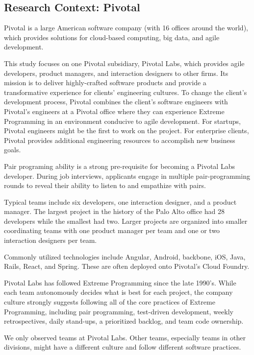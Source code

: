 \subsection{Research Context: Pivotal}
\label{ResearchContext}

Pivotal is a large American software company (with 16 offices around the world), which provides solutions for cloud-based computing, big data, and agile development. 

This study focuses on one Pivotal subsidiary, Pivotal Labs, which provides agile developers, product managers, and interaction designers to other firms. Its mission is to deliver highly-crafted software products and provide a transformative experience for clients’ engineering cultures. To change the client’s development process, Pivotal combines the client's software engineers with Pivotal's engineers at a Pivotal office where they can experience Extreme Programming in an environment conducive to agile development. For startups, Pivotal engineers might be the first to work on the project. For enterprise clients, Pivotal provides additional engineering resources to accomplish new business goals. 

Pair programing ability is a strong pre-requisite for becoming a Pivotal Labs developer. During job interviews, applicants engage in multiple pair-programming rounds to reveal their ability to listen to and empathize with pairs. 

Typical teams include six developers, one interaction designer, and a product manager. The largest project in the history of the Palo Alto office had 28 developers while the smallest had two. Larger projects are organized into smaller coordinating teams with one product manager per team and one or two interaction designers per team. 

Commonly utilized technologies include Angular, Android, backbone, iOS, Java, Rails, React, and Spring. These are often deployed onto Pivotal’s Cloud Foundry. 

Pivotal Labs has followed Extreme Programming \cite{BeckExtremeProgramming2004} since the late 1990's. While each team autonomously decides what is best for each project, the company culture strongly suggests following all of the core practices of Extreme Programming, including pair programming, test-driven development, weekly retrospectives, daily stand-ups, a prioritized backlog, and team code ownership.

We only observed teams at Pivotal Labs. Other teams, especially teams in other divisions, might have a different culture and follow different software practices.
